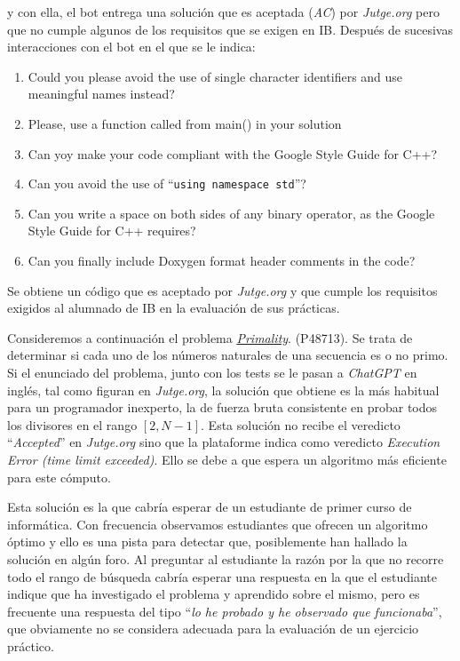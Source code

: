 \documentclass[twocolumn,twoside,a4paper, 10pt]{article}
\newcommand{\jutge}{\textit{Jutge.org}{}}           %
\newcommand{\ChatGPT}{\textit{ChatGPT}{}}           %
\begin{document}
y con ella, el bot entrega una solución que es aceptada (\textit{AC}) por \jutge{} pero que no cumple algunos de los
requisitos que se exigen en IB.
Después de sucesivas interacciones con el bot en el que se le indica:
\begin{enumerate}
  \item Could you please avoid the use of single character identifiers and use meaningful names instead?
  \item Please, use a function called from main() in your solution
  \item Can yoy make your code compliant with the Google Style Guide for C++?
  \item Can you avoid the use of ``\texttt{using namespace std}''?
  \item Can you write a space on both sides of any binary operator, as the Google Style Guide for C++ requires?
  \item Can you finally include Doxygen format header comments in the code?
\end{enumerate}
Se obtiene un código que es aceptado por \jutge{} y que cumple los requisitos exigidos al alumnado de IB en la
evaluación de sus prácticas.

Consideremos a continuación el problema 
\href{https://jutge.org/problems/P48713_en}{\textit{Primality}}.
(P48713).
Se trata de determinar si cada uno de los números naturales de una secuencia es o no primo.
Si el enunciado del problema, junto con los tests se le pasan a \ChatGPT{} en inglés, tal como figuran en
\jutge{}, la solución que obtiene es la más habitual para un programador inexperto, la de fuerza bruta 
consistente en probar todos los divisores en el rango $[2, N-1]$.
Esta solución no recibe el veredicto ``\textit{Accepted}'' en \jutge{} sino que la plataforme indica
como veredicto \textit{Execution Error (time limit exceeded)}.
Ello se debe a que espera un algoritmo más eficiente para este cómputo.

Esta solución es la que cabría esperar de un estudiante de primer curso de informática.
Con frecuencia observamos estudiantes que ofrecen un algoritmo óptimo y ello es una pista para detectar que,
posiblemente han hallado la solución en algún foro. 
Al preguntar al estudiante la razón por la que no recorre todo el rango de búsqueda cabría esperar una
respuesta en la que el estudiante indique que ha investigado el problema y aprendido sobre el mismo, pero es
frecuente una respuesta del tipo ``\textit{lo he probado y he observado que funcionaba}'', que obviamente no se
considera adecuada para la evaluación de un ejercicio práctico.
\end{document}
